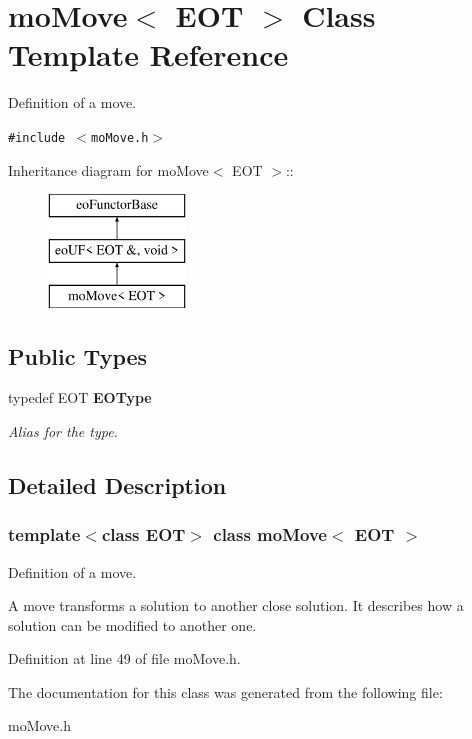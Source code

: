 \section{mo\-Move$<$ EOT $>$ Class Template Reference}
\label{classmo_move}
Definition of a move.  


{\tt \#include $<$mo\-Move.h$>$}

Inheritance diagram for mo\-Move$<$ EOT $>$::\begin{figure}[H]
\begin{center}
\leavevmode
\includegraphics[height=3cm]{classmo_move}
\end{center}
\end{figure}
\subsection*{Public Types}
\begin{CompactItemize}
\item 
typedef EOT \bf{EOType}\label{classmo_move_7fb853a91ba1319530529e515380bbba}

\begin{CompactList}\small\item\em Alias for the type. \item\end{CompactList}\end{CompactItemize}


\subsection{Detailed Description}
\subsubsection*{template$<$class EOT$>$ class mo\-Move$<$ EOT $>$}

Definition of a move. 

A move transforms a solution to another close solution. It describes how a solution can be modified to another one. 



Definition at line 49 of file mo\-Move.h.

The documentation for this class was generated from the following file:\begin{CompactItemize}
\item 
mo\-Move.h\end{CompactItemize}
